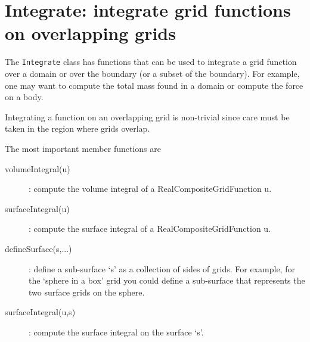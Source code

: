 \section{Integrate: integrate grid functions on overlapping grids} \label{Integrate}

The {\tt Integrate} class has functions that can be used to integrate a grid
function over a domain or over the boundary (or a subset of the boundary).
For example, one may want to compute the total mass found in a domain 
or compute the force on a body.

Integrating a function on an overlapping grid is non-trivial since care must
be taken in the region where grids overlap.


The most important member functions are
\begin{description}
  \item[volumeIntegral(u)] : compute the volume integral of a RealCompositeGridFunction u.
  \item[surfaceIntegral(u)] : compute the surface integral of a RealCompositeGridFunction u.
  \item[defineSurface(s,...)] : define a sub-surface `s' as a collection of sides of grids. For example,
     for the `sphere in a box' grid you could define a sub-surface that represents the two surface
     grids on the sphere.
  \item[surfaceIntegral(u,s)] : compute the surface integral on the surface `s'.
\end{description}


